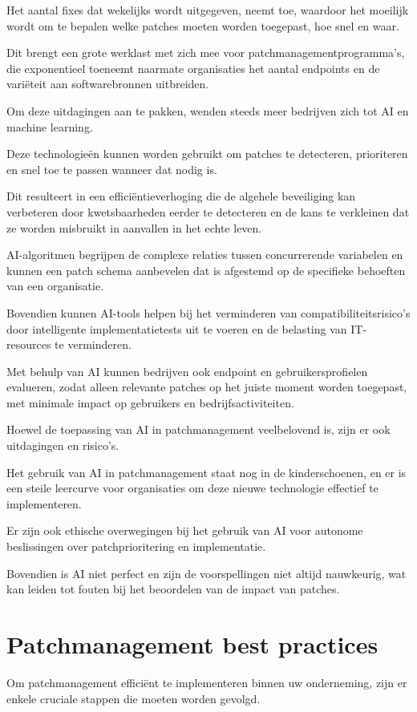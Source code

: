  Het aantal fixes dat wekelijks wordt uitgegeven, neemt toe, waardoor het moeilijk wordt om te bepalen welke patches moeten worden toegepast, hoe snel en waar.

 Dit brengt een grote werklast met zich mee voor patchmanagementprogramma's, die exponentieel toeneemt naarmate organisaties het aantal endpoints en de variëteit aan softwarebronnen uitbreiden.


Om deze uitdagingen aan te pakken, wenden steeds meer bedrijven zich tot AI en machine learning.

 Deze technologieën kunnen worden gebruikt om patches te detecteren, prioriteren en snel toe te passen wanneer dat nodig is.

 Dit resulteert in een efficiëntieverhoging die de algehele beveiliging kan verbeteren door kwetsbaarheden eerder te detecteren en de kans te verkleinen dat ze worden misbruikt in aanvallen in het echte leven.


AI-algoritmen begrijpen de complexe relaties tussen concurrerende variabelen en kunnen een patch schema aanbevelen dat is afgestemd op de specifieke behoeften van een organisatie.

 Bovendien kunnen AI-tools helpen bij het verminderen van compatibiliteitsrisico's door intelligente implementatietests uit te voeren en de belasting van IT-resources te verminderen.

 Met behulp van AI kunnen bedrijven ook endpoint en gebruikersprofielen evalueren, zodat alleen relevante patches op het juiste moment worden toegepast, met minimale impact op gebruikers en bedrijfsactiviteiten.


Hoewel de toepassing van AI in patchmanagement veelbelovend is, zijn er ook uitdagingen en risico's.

 Het gebruik van AI in patchmanagement staat nog in de kinderschoenen, en er is een steile leercurve voor organisaties om deze nieuwe technologie effectief te implementeren.

 Er zijn ook ethische overwegingen bij het gebruik van AI voor autonome beslissingen over patchprioritering en implementatie.

 Bovendien is AI niet perfect en zijn de voorspellingen niet altijd nauwkeurig, wat kan leiden tot fouten bij het beoordelen van de impact van patches.

 \autocite{OFlaherty2023}

\section{Patchmanagement best practices}
Om patchmanagement efficiënt te implementeren binnen uw onderneming, zijn er enkele cruciale stappen die moeten worden gevolgd.

